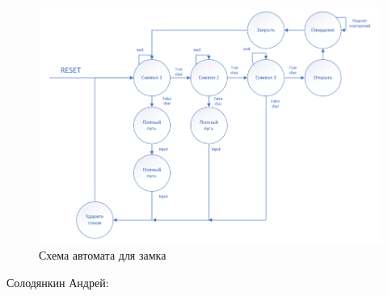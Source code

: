 \documentclass[a4paper,14pt]{article}
\begin{document}
\begin{enumerate}
		\begin{figure}[H]
			\centering
			\includegraphics[width=0.9\linewidth]{images/q_3}
			\caption{Схема автомата для замка}
			\label{fig:q_3}
		\end{figure}
	\end{enumerate}
	
	Солодянкин Андрей:
\end{document}
